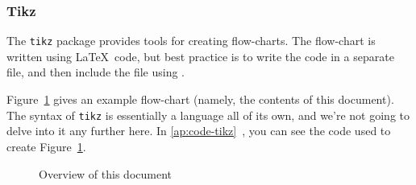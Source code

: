 \subsubsection{Tikz}
The \lstinline|tikz| package provides tools for creating flow-charts.
The flow-chart is written using \LaTeX\ code,
but best practice is to write the code in a separate file,
and then include the file using \lstinline||.
\par
Figure~\ref{fig:structure} gives an example flow-chart (namely, the contents of this document).
The syntax of \lstinline|tikz| is essentially a language all of its own,
and we're not going to delve into it any further here.
In \ref{ap:code-tikz}~, you can see the code used to create Figure~\ref{fig:structure}.
\begin{figure}[H]
    \centering
    
    \caption{Overview of this document}
    \label{fig:structure}
\end{figure}
